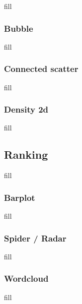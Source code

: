 \documentclass[
  b5paper]{book}
\begin{document}
fill

\hypertarget{bubble}{%
\subsubsection*{Bubble}\label{bubble}}

fill

\hypertarget{connected-scatter}{%
\subsubsection*{Connected scatter}\label{connected-scatter}}

fill

\hypertarget{density-2d}{%
\subsubsection*{Density 2d}\label{density-2d}}

fill

\hypertarget{ranking}{%
\subsection*{Ranking}\label{ranking}}

fill

\hypertarget{barplot}{%
\subsubsection*{Barplot}\label{barplot}}

fill

\hypertarget{spider-radar}{%
\subsubsection*{Spider / Radar}\label{spider-radar}}

fill

\hypertarget{wordcloud}{%
\subsubsection*{Wordcloud}\label{wordcloud}}

fill
\end{document}
